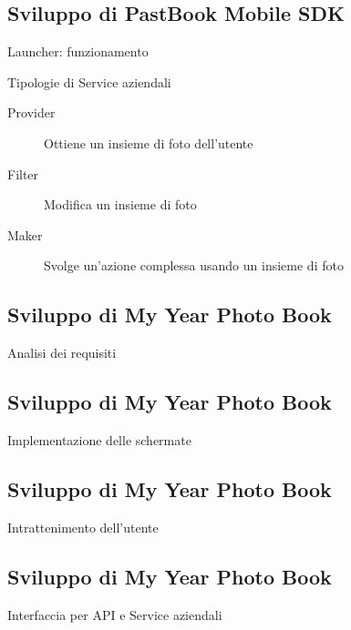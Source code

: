 	\subsection{Sviluppo di PastBook Mobile SDK}
		\begin{frame}{Launcher: funzionamento}
			\fontsize{8pt}{7}\selectfont
			\begin{block}{Tipologie di Service aziendali}
				\begin{description}
					\item[Provider] Ottiene un insieme di foto dell'utente
					\item[Filter] Modifica un insieme di foto
					\item[Maker] Svolge un'azione complessa usando un insieme di foto	
				\end{description}
			\end{block}
			
		\end{frame}
	\subsection{Sviluppo di My Year Photo Book}
		\begin{frame}{Analisi dei requisiti}
		\end{frame}
	\subsection{Sviluppo di My Year Photo Book}
		\begin{frame}{Implementazione delle schermate}
		\end{frame}
	\subsection{Sviluppo di My Year Photo Book}
		\begin{frame}{Intrattenimento dell'utente}
		\end{frame}
	\subsection{Sviluppo di My Year Photo Book}
		\begin{frame}{Interfaccia per API e Service aziendali}
		\end{frame}
